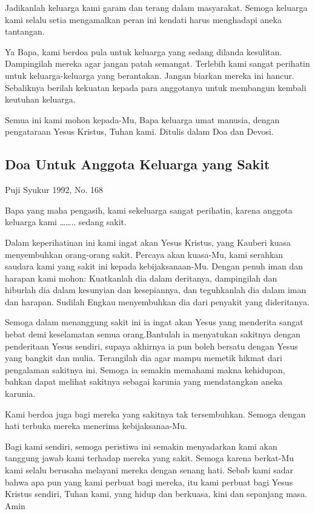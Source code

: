 \documentclass[titlepage,11pt,openany]{scrbook}
\newcommand{\ps}[2][\numexpr\value{subsection}+1\relax]{%
\setcounter{subsection}{\numexpr#1-1\relax}
\subsection{#2}
}
\begin{document}
Jadikanlah keluarga kami garam dan terang dalam masyarakat. Semoga keluarga kami selalu setia mengamalkan peran ini kendati harus menghadapi aneka tantangan.

Ya Bapa, kami berdoa pula untuk keluarga yang sedang dilanda kesulitan. Dampingilah mereka agar jangan patah semangat. Terlebih kami sangat perihatin untuk keluarga-keluarga yang berantakan. Jangan biarkan mereka ini hancur. Sebaliknya berilah kekuatan kepada para anggotanya untuk membangun kembali keutuhan keluarga.

Semua ini kami mohon kepada-Mu, Bapa keluarga umat manusia, dengan pengataraan Yesus Kristus, Tuhan kami.
Ditulis dalam Doa dan Devosi. 

\ps[168]{Doa Untuk Anggota Keluarga yang Sakit}
Puji Syukur 1992, No. 168

Bapa yang maha pengasih, kami sekeluarga sangat perihatin, karena anggota keluarga kami …….. sedang sakit.

Dalam keperihatinan ini kami ingat akan Yesus Kristus, yang Kauberi kuasa menyembuhkan orang-orang sakit. Percaya akan kuasa-Mu, kami serahkan saudara kami yang sakit ini kepada kebijaksanaan-Mu. Dengan penuh iman dan harapan kami mohon: Kuatkanlah dia dalam deritanya, dampingilah dan hiburlah dia dalam kesunyian dan kesepiannya, dan teguhkanlah dia dalam iman dan harapan. Sudilah Engkau menyembuhkan dia dari penyakit yang dideritanya.

Semoga dalam menanggung sakit ini ia ingat akan Yesus yang menderita sangat hebat demi keselamatan semua orang.Bantulah ia menyatukan sakitnya dengan penderitaan Yesus sendiri, supaya akhirnya ia pun boleh bersatu dengan Yesus yang bangkit dan mulia. Terangilah dia agar mampu memetik hikmat dari pengalaman sakitnya ini. Semoga ia semakin memahami makna kehidupan, bahkan dapat melihat sakitnya sebagai karunia yang mendatangkan aneka karunia.

Kami berdoa juga bagi mereka yang sakitnya tak tersembuhkan. Semoga dengan hati terbuka mereka menerima kebijaksanaa-Mu.

Bagi kami sendiri, semoga peristiwa ini semakin menyadarkan kami akan tanggung jawab kami terhadap mereka yang sakit. Semoga karena berkat-Mu kami selalu berusaha melayani mereka dengan senang hati. Sebab kami sadar bahwa apa pun yang kami perbuat bagi mereka, itu kami perbuat bagi Yesus Kristus sendiri, Tuhan kami, yang hidup dan berkuasa, kini dan sepanjang masa. Amin
\end{document}
